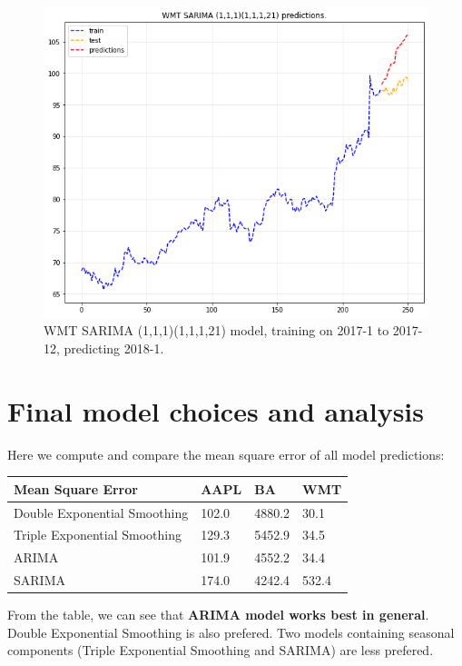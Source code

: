 \documentclass[11pt]{article}
\begin{document}
\begin{figure}[h!]
\centerline{\includegraphics[scale=0.5]{sarima_p3.png}}
\caption{WMT SARIMA (1,1,1)(1,1,1,21) model, training on 2017-1 to 2017-12, predicting 2018-1.}
\end{figure}

\newpage

\section{Final model choices and analysis}\label{section-pred}
Here we compute and compare the mean square error of all model predictions:

\begin{table}[h!]
\begin{tabular}{llll}
\hline
\hline
Mean Square Error            & AAPL  & BA     & WMT   \\
\hline
Double Exponential Smoothing & 102.0 & 4880.2 & 30.1  \\
Triple Exponential Smoothing & 129.3 & 5452.9 & 34.5  \\
ARIMA                        & 101.9 & 4552.2 & 34.4  \\
SARIMA                       & 174.0 & 4242.4 & 532.4  \\
\hline
\hline
\end{tabular}
\end{table}

From the table, we can see that \textbf{ARIMA model works best in general}. Double Exponential Smoothing is also prefered. Two models containing seasonal components (Triple Exponential Smoothing and SARIMA) are less prefered.
\end{document}

